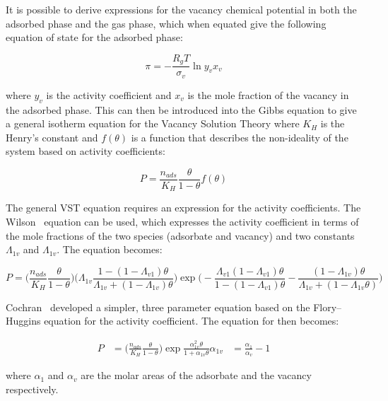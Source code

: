 It is possible to derive expressions for the vacancy chemical potential in both
the adsorbed phase and the gas phase, which when equated give the following equation
of state for the adsorbed phase:

\begin{equation}
    \pi = - \frac{R_g T}{\sigma_v} \ln{y_v x_v}
\end{equation}

where \(y_v\) is the activity coefficient and  \(x_v\) is the mole fraction of
the vacancy in the adsorbed phase.
This can then be introduced into the Gibbs equation to give a general isotherm equation
for the Vacancy Solution Theory where \(K_H\) is the Henry’s constant and
\(f(\theta)\) is a function that describes the non-ideality of the system based
on activity coefficients:

\begin{equation}
    P = \frac{n_{ads}}{K_H} \frac{\theta}{1-\theta} f(\theta)
\end{equation}

The general VST equation requires an expression for the activity coefficients.
The Wilson~\cite{suwanayuenGasAdsorptionIsotherm1980} equation can be used, 
which expresses the activity coefficient in terms
of the mole fractions of the two species (adsorbate and vacancy) and two constants
\(\Lambda_{1v}\) and \(\Lambda_{1v}\). The equation becomes:

\begin{equation}
P = \bigg( \frac{n_{ads}}{K_H} \frac{\theta}{1-\theta} \bigg)
    \bigg( \Lambda_{1v} \frac{1-(1-\Lambda_{v1})\theta}{\Lambda_{1v}+(1-\Lambda_{1v})\theta} \bigg)
    \exp{\bigg( -\frac{\Lambda_{v1}(1-\Lambda_{v1})\theta}{1-(1-\Lambda_{v1})\theta}
    -\frac{(1 - \Lambda_{1v})\theta}{\Lambda_{1v} + (1-\Lambda_{1v}\theta)} \bigg)}
\end{equation}

Cochran~\cite{cochranVacancySolutionTheory1985} 
developed a simpler, three parameter equation based on
the Flory–Huggins equation for the activity coefficient.
The equation for then becomes:

\begin{align}
    P &= \bigg( \frac{n_{ads}}{K_H} \frac{\theta}{1-\theta} \bigg)
        \exp{\frac{\alpha^2_{1v}\theta}{1+\alpha_{1v}\theta}}
    \alpha_{1v} &= \frac{\alpha_{1}}{\alpha_{v}} - 1
\end{align}

where \(\alpha_{1}\) and \(\alpha_{v}\) are the molar areas of the adsorbate
and the vacancy respectively.